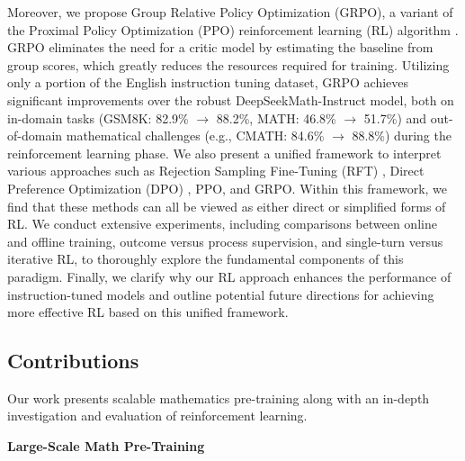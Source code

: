 Moreover, we propose Group Relative Policy Optimization (GRPO), a variant of the Proximal Policy Optimization (PPO) reinforcement learning (RL) algorithm \citep{schulman2017proximal}. GRPO eliminates the need for a critic model by estimating the baseline from group scores, which greatly reduces the resources required for training. Utilizing only a portion of the English instruction tuning dataset, GRPO achieves significant improvements over the robust DeepSeekMath-Instruct model, both on in-domain tasks (GSM8K: 82.9\% $\rightarrow$ 88.2\%, MATH: 46.8\% $\rightarrow$ 51.7\%) and out-of-domain mathematical challenges (e.g., CMATH: 84.6\% $\rightarrow$ 88.8\%) during the reinforcement learning phase. We also present a unified framework to interpret various approaches such as Rejection Sampling Fine-Tuning (RFT) \citep{yuan2023scaling}, Direct Preference Optimization (DPO) \citep{dpo}, PPO, and GRPO. Within this framework, we find that these methods can all be viewed as either direct or simplified forms of RL. We conduct extensive experiments, including comparisons between online and offline training, outcome versus process supervision, and single-turn versus iterative RL, to thoroughly explore the fundamental components of this paradigm. Finally, we clarify why our RL approach enhances the performance of instruction-tuned models and outline potential future directions for achieving more effective RL based on this unified framework.

\subsection{Contributions}
Our work presents scalable mathematics pre-training along with an in-depth investigation and evaluation of reinforcement learning.

\textbf{Large-Scale Math Pre-Training}

